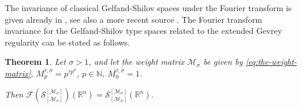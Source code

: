 \documentclass{article}
\theoremstyle{thmstyleone}
\newtheorem{Theorem}{Theorem}[section]%
\theoremstyle{thmstyletwo}%
\theoremstyle{thmstylethree}%
\begin{document}
The invariance of classical Gelfand-Shilov spaces 
under the Fourier transform is given already in \cite{GelfandShilov}, see also 
a more recent source \cite[Chapter 6]{Nicola-Rodino}.
The Fourier transform invariance for the 
Gelfand-Shilov type spaces related to the extended Gevrey regularity can be stated as follows.


\begin{Theorem}\label{Thm:invariant F}
    Let $\sigma>1$, and let the weight matrix $\mathcal{M}_\sigma$ be given by 
\eqref{eq:the-weight-matrix}, 
$ M_{p}^{\tau,\sigma}=p^{\tau p^\sigma}$, $ p\in \mathbb{N}$, $ M_0^{\tau,\sigma}=1$.
    
Then $ \mathcal{F} ( \mathcal S_{[\mathcal{M}_\sigma]}^{[\mathcal{M}_\sigma]} ) (\mathbb R^n) = 
\mathcal S_{[\mathcal{M}_\sigma]}^{[\mathcal{M}_\sigma]} (\mathbb R^n).$ 
\end{Theorem}
    
\end{document}
